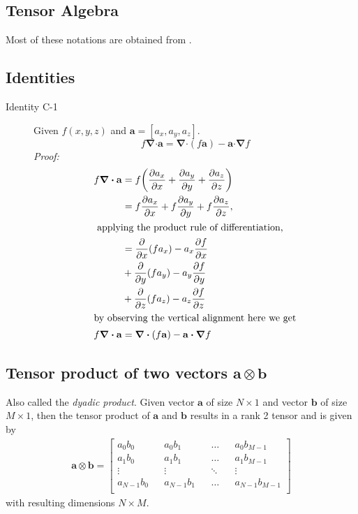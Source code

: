 \documentclass[10pt,letterpaper,notitlepage]{article}
\numberwithin{equation}{section}
\newcommand{\partialderiv}[2]{\frac{\partial #1}{\partial #2}}
\newcommand{\bnabla}{\boldsymbol{\nabla}}
\newcommand{\dotp}{\boldsymbol{\cdot}}
\newcommand{\beqn}{\begin{equation}\begin{aligned}}
\newcommand{\eeqn}{\end{aligned}\end{equation}}
\begin{document}
\begin{appendices}
\newpage
\section{Tensor Algebra}
Most of these notations are obtained from \cite{Moukalled}.
\subsection{Identities}
\begin{description}
	\item [Identity C-1] Given $f(x,y,z)$ and $\mathbf{a} = [a_x, a_y, a_z]$.
	$$
	f \bnabla \dotp \mathbf{a} = \bnabla \dotp (f\mathbf{a}) - \mathbf{a} \dotp \bnabla f
	$$
	\textit{Proof:}
	\begin{align}
	f \bnabla \dotp \mathbf{a} &= f \biggr( 
	\partialderiv{a_x}{x} + \partialderiv{a_y}{y} + \partialderiv{a_z}{z}
	\biggr) \\
	&= f\partialderiv{a_x}{x} + f\partialderiv{a_y}{y} + f\partialderiv{a_z}{z},\\
	\intertext{	applying the product rule of differentiation,}
	&=\partialderiv{}{x}(fa_x) - a_x \partialderiv{f}{x} \\
	&+\partialderiv{}{y}(fa_y) - a_y \partialderiv{f}{y}\\
	&+\partialderiv{}{z}(fa_z) - a_z \partialderiv{f}{z}\\
	\intertext{by observing the vertical alignment here we get}
	f \bnabla \dotp \mathbf{a}&=\bnabla \dotp (f\mathbf{a}) - \mathbf{a}\dotp \bnabla f
	\end{align}

		
\end{description}
\vspace{1cm}
\subsection{Tensor product of two vectors $\mathbf{a} \otimes \mathbf{b}$}
Also called the \textit{dyadic product}. Given vector $\mathbf{a}$ of size $N{\times}1$ and vector $\mathbf{b}$ of size $M{\times}1$, then the tensor product of $\mathbf{a}$ and $\mathbf{b}$ results in a rank 2 tensor and is given by
\beqn 
\mathbf{a}\otimes\mathbf{b} = 
\begin{bmatrix}
a_0 b_0 && a_0 b_1 && \dots   && a_0 b_{M-1} \\
a_1 b_0 && a_1 b_1 && \dots   && a_1 b_{M-1} \\
\vdots    && \vdots    && \ddots && \vdots \\
a_{N-1} b_0 && a_{N-1} b_1 && \dots   && a_{N-1} b_{M-1} \\
\end{bmatrix}
\eeqn 
with resulting dimensions $N{\times}M$.



\end{appendices}
\end{document}
